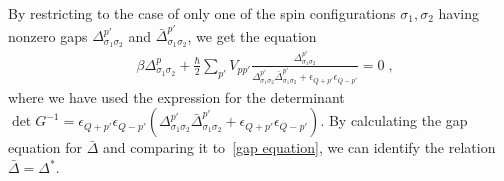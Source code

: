 \documentclass{article}
\begin{document}
By restricting to the case of only one of the spin configurations $\sigma_1, \sigma_2$ having nonzero gaps $\Delta^{p'}_{\sigma_1 \sigma_2}$ and $\bar{\Delta}^{p'}_{\sigma_1 \sigma_2}$, we get the equation
\begin{align}
     &\beta \Delta_{\sigma_1 \sigma_2}^p + \frac{\hbar}{2} \sum_{p'} V_{pp'} \frac{\Delta^{p'}_{\sigma_1 \sigma_2}}{\Delta^{p'}_{\sigma_1 \sigma_2} \bar{\Delta}^{p'}_{\sigma_1 \sigma_2} + \epsilon_{Q+p'} \epsilon_{Q-p'}} = 0 \;,
\label{gap equation}
\end{align}
where we have used the expression for the determinant $\det{G^{-1}} = \epsilon_{Q+p'} \epsilon_{Q-p'} \left( \Delta^{p'}_{\sigma_1 \sigma_2} \bar{\Delta}^{p'}_{\sigma_1 \sigma_2} + \epsilon_{Q+p'}\epsilon_{Q-p'}\right)$. By calculating the gap equation for $\bar{\Delta}$ and comparing it to~\cref{gap equation}, we can identify the relation $\bar{\Delta} = \Delta^*$. 
\end{document}
